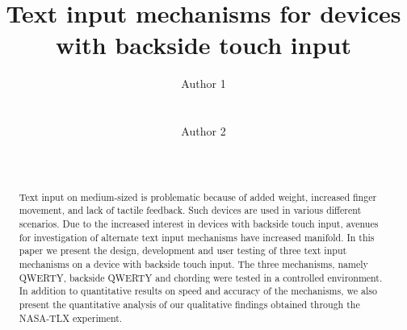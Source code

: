\documentclass{chi2011}
\begin{document}
\setlength{\paperheight}{11in}
\setlength{\paperwidth}{8.5in}
\setlength{\pdfpageheight}{\paperheight}
\setlength{\pdfpagewidth}{\paperwidth}


\title{Text input mechanisms for devices with backside touch input}
\author{
  \alignauthor Author 1\\
    \\
    \\
  \alignauthor Author 2\\
    \\
    \\
}

\maketitle

\begin{abstract}
 Text input on medium-sized is problematic because of added weight, increased finger movement, and lack of tactile feedback. Such devices are used in various different scenarios. Due to the increased interest in devices with backside touch input, avenues for investigation of alternate text input mechanisms have increased manifold. In this paper we present the design, development and user testing of three text input mechanisms on a device with backside touch input. The three mechanisms, namely QWERTY, backside QWERTY and chording were tested in a controlled environment. In addition to quantitative results on speed and accuracy of the mechanisms, we also present the quantitative analysis of our qualitative findings obtained through the NASA-TLX experiment.
\end{abstract}







\end{document}
